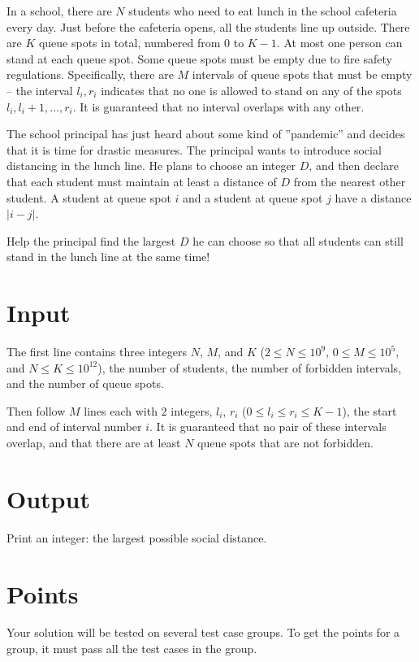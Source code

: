
In a school, there are $N$ students who need to eat lunch in the school cafeteria every day.
Just before the cafeteria opens, all the students line up outside.
There are $K$ queue spots in total, numbered from $0$ to $K-1$.
At most one person can stand at each queue spot.
Some queue spots must be empty due to fire safety regulations.
Specifically, there are $M$ intervals of queue spots that must be empty --
the interval $l_i, r_i$ indicates that no one is allowed to stand on any of the spots $l_i, l_i+1, \ldots, r_i$.
It is guaranteed that no interval overlaps with any other.

The school principal has just heard about some kind of ”pandemic” and decides that it is time for drastic measures.
The principal wants to introduce social distancing in the lunch line.
He plans to choose an integer $D$, and then declare that each student must maintain at least a distance of $D$
from the nearest other student.
A student at queue spot $i$ and a student at queue spot $j$ have a distance $|i-j|$.

Help the principal find the largest $D$ he can choose so that all students can still stand in the lunch line at the same time!


\section*{Input}
The first line contains three integers $N$, $M$, and $K$ ($2 \leq N \leq 10^9$, $0 \leq M \leq 10^5$, and $N \leq K \leq 10^{12}$),
the number of students, the number of forbidden intervals, and the number of queue spots.

Then follow $M$ lines each with $2$ integers, $l_i$, $r_i$ ($0 \leq l_i \leq r_i \leq K-1$), the start and end of interval number $i$.
It is guaranteed that no pair of these intervals overlap, and that there are at least $N$ queue spots that are not forbidden.

\section*{Output}
Print an integer: the largest possible social distance.

\section*{Points}
Your solution will be tested on several test case groups.
To get the points for a group, it must pass all the test cases in the group.

